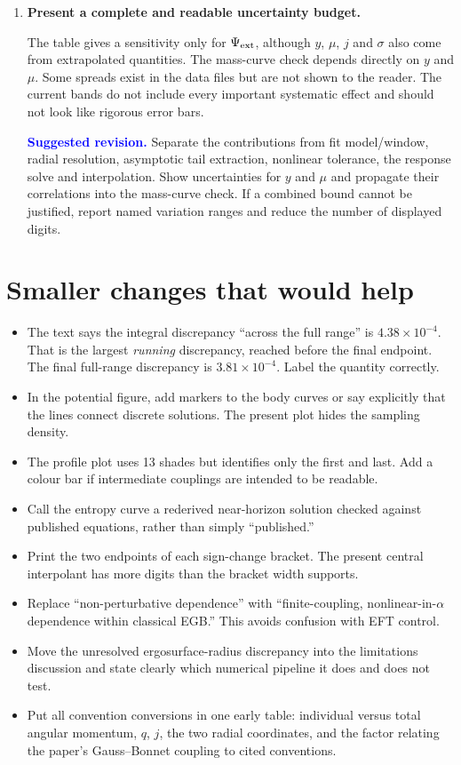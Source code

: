 \documentclass[11pt,a4paper]{article}
\newcommand{\issue}[1]{\textcolor{critical}{\textbf{#1}}}
\newcommand{\suggestion}[1]{\par\smallskip\noindent\textcolor{blue}{\textbf{Suggested revision.}} #1}
\begin{document}
\begin{enumerate}
\item \issue{Present a complete and readable uncertainty budget.}

The table gives a sensitivity only for $\Psi_{\rm ext}$, although $y$, $\mu$, $j$ and $\sigma$ also come from extrapolated quantities.  The mass-curve check depends directly on $y$ and $\mu$.  Some spreads exist in the data files but are not shown to the reader.  The current bands do not include every important systematic effect and should not look like rigorous error bars.

\suggestion{Separate the contributions from fit model/window, radial resolution, asymptotic tail extraction, nonlinear tolerance, the response solve and interpolation.  Show uncertainties for $y$ and $\mu$ and propagate their correlations into the mass-curve check.  If a combined bound cannot be justified, report named variation ranges and reduce the number of displayed digits.}
\end{enumerate}

\section*{Smaller changes that would help}

\begin{itemize}
\item The text says the integral discrepancy ``across the full range'' is $4.38\times10^{-4}$.  That is the largest \emph{running} discrepancy, reached before the final endpoint.  The final full-range discrepancy is $3.81\times10^{-4}$.  Label the quantity correctly.
\item In the potential figure, add markers to the body curves or say explicitly that the lines connect discrete solutions.  The present plot hides the sampling density.
\item The profile plot uses 13 shades but identifies only the first and last.  Add a colour bar if intermediate couplings are intended to be readable.
\item Call the entropy curve a rederived near-horizon solution checked against published equations, rather than simply ``published.''
\item Print the two endpoints of each sign-change bracket.  The present central interpolant has more digits than the bracket width supports.
\item Replace ``non-perturbative dependence'' with ``finite-coupling, nonlinear-in-$\alpha$ dependence within classical EGB.''  This avoids confusion with EFT control.
\item Move the unresolved ergosurface-radius discrepancy into the limitations discussion and state clearly which numerical pipeline it does and does not test.
\item Put all convention conversions in one early table: individual versus total angular momentum, $q$, $j$, the two radial coordinates, and the factor relating the paper's Gauss--Bonnet coupling to cited conventions.
\end{itemize}
\end{document}
